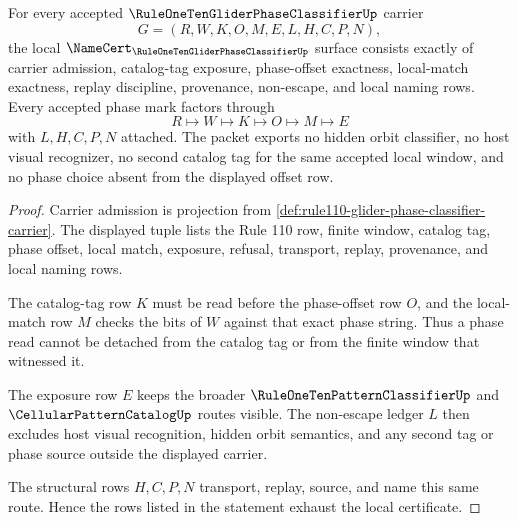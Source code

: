 \begin{theorem}
\label{thm:rule110-glider-phase-classifier-obligations}
For every accepted $\RuleOneTenGliderPhaseClassifierUp$ carrier
$$
G=(R,W,K,O,M,E,L,H,C,P,N),
$$
the local $\NameCert_{\RuleOneTenGliderPhaseClassifierUp}$ surface consists exactly of carrier admission, catalog-tag exposure, phase-offset exactness, local-match exactness, replay discipline, provenance, non-escape, and local naming rows. Every accepted phase mark factors through
$$
R \longmapsto W \longmapsto K \longmapsto O \longmapsto M \longmapsto E
$$
with $L,H,C,P,N$ attached. The packet exports no hidden orbit classifier, no host visual recognizer, no second catalog tag for the same accepted local window, and no phase choice absent from the displayed offset row.
\end{theorem}
\begin{proof}
Carrier admission is projection from \autoref{def:rule110-glider-phase-classifier-carrier}. The displayed tuple lists the Rule 110 row, finite window, catalog tag, phase offset, local match, exposure, refusal, transport, replay, provenance, and local naming rows.

The catalog-tag row $K$ must be read before the phase-offset row $O$, and the local-match row $M$ checks the bits of $W$ against that exact phase string. Thus a phase read cannot be detached from the catalog tag or from the finite window that witnessed it.

The exposure row $E$ keeps the broader $\RuleOneTenPatternClassifierUp$ and $\CellularPatternCatalogUp$ routes visible. The non-escape ledger $L$ then excludes host visual recognition, hidden orbit semantics, and any second tag or phase source outside the displayed carrier.

The structural rows $H,C,P,N$ transport, replay, source, and name this same route. Hence the rows listed in the statement exhaust the local certificate.
\end{proof}

